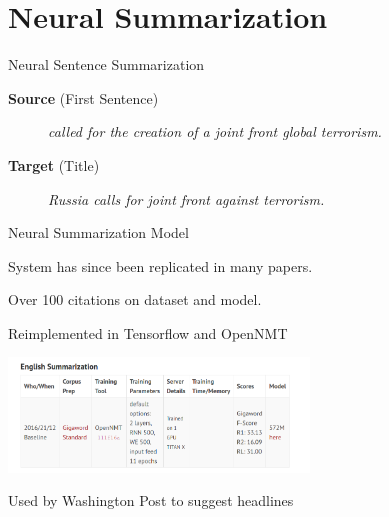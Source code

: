 \documentclass{beamer}
\let\tempone\itemize
\let\temptwo\enditemize
\renewenvironment{itemize}{\tempone\addtolength{\itemsep}{0.5\baselineskip}}{\temptwo}
\newcommand{\mair}{\vspace{-0.25cm}}
\newcommand{\Cite}[1]{{\footnotesize \citep{#1}}}
\begin{document}
\section{Neural Summarization}


\begin{frame}{Neural Sentence Summarization \Cite{Rush2015}}
  \begin{center}
    \textbf{Source} (First Sentence)
  \end{center}
  
  \begin{figure}
    \textit{
      called  for the creation of
      a joint front  global terrorism. }
  \end{figure}

  \begin{center}
    \textbf{Target} (Title)
  \end{center}
  \mair

  \begin{figure}
    \centering
    \textit{\alert<2>{Russia} calls for joint
      front \alert<2>{against} terrorism.}
  \end{figure}
\end{frame}

\begin{frame}{Neural Summarization Model}
  \begin{itemize}
  \item System has since been replicated in many papers.
  \item Over 100 citations on dataset and model.
  \item Reimplemented in Tensorflow and OpenNMT

  \begin{center}
    \includegraphics[width=8cm]{onmtsum}
  \end{center}
  \item Used by Washington Post to suggest headlines \Cite{shuguangwang}
  \end{itemize}
\end{frame}
\end{document}
